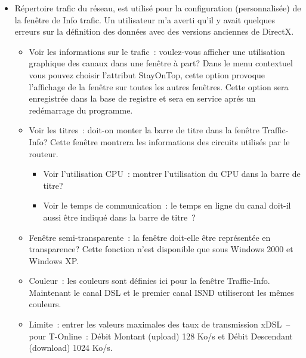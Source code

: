 \begin{itemize}
  \item Répertoire trafic du réseau, est utilisé pour la configuration
    (personnalisée) de la fenêtre de Info trafic. Un utilisateur m'a averti qu'il
    y avait quelques erreurs sur la définition des données avec des versions
    anciennes de DirectX.
    \begin{itemize}
      \item Voir les informations sur le trafic~: voulez-vous afficher une utilisation
        graphique des canaux dans une fenêtre à part? Dans le menu contextuel vous
        pouvez choisir l'attribut StayOnTop, cette option provoque l'affichage de la
        fenêtre sur toutes les autres fenêtres. Cette option sera enregistrée dans
        la base de registre et sera en service aprés un redémarrage du programme.
      \item Voir les titres~: doit-on monter la barre de titre dans la fenêtre
        Traffic-Info? Cette fenêtre montrera les informations des circuits utilisés
        par le routeur.
        \begin{itemize}
          \item Voir l'utilisation CPU~: montrer l'utilisation du CPU dans la barre
            de titre?
          \item Voir le temps de communication~: le temps en ligne du canal doit-il
            aussi être indiqué dans la barre de titre~?
        \end{itemize}
      \item Fenêtre semi-transparente~: la fenêtre doit-elle être représentée en
        transparence? Cette fonction n'est disponible que sous
        Windows 2000 et Windows XP.
      \item Couleur~: les couleurs sont définies ici pour la fenêtre Traffic-Info.
        Maintenant le canal DSL et le premier canal ISND utiliseront les mêmes
        couleurs. 
      \item Limite~: entrer les valeurs maximales des taux de transmission xDSL~--
        pour T-Online~: Débit Montant (upload) 128 Ko/s et Débit Descendant
       (download) 1024 Ko/s.
    \end{itemize}


\end{itemize}

